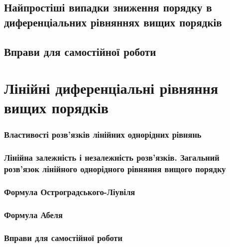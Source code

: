 \documentclass[a4paper, 12pt]{article}
\theoremstyle{definition}
\numberwithin{equation}{section}%
\numberwithin{equation}{subsection}
\begin{document}


\subsection{Найпростіші випадки зниження порядку в диференціальних рівняннях вищих порядків}



\subsection{Вправи для самостійної роботи}



\section{Лінійні диференціальні рівняння вищих порядків}



\subsubsection{Властивості роз\-в'яз\-ків лінійних однорідних рівнянь}



\subsubsection{Лінійна залежність і незалежність роз\-в'яз\-ків. Загальний роз\-в'яз\-ок лінійного однорідного рівняння вищого порядку}



\subsubsection{Формула Остроградського-Ліувіля}



\subsubsection{Формула Абеля}



\subsubsection{Вправи для самостійної роботи}
\end{document}
